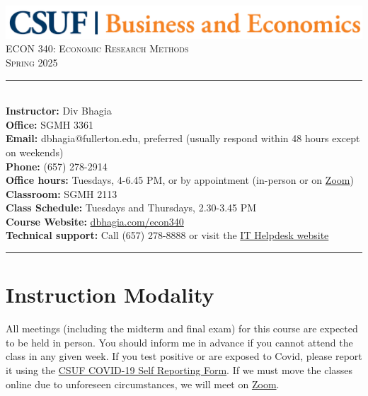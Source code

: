 \documentclass{syllabus}
\begin{document}
\begin{center}
\includegraphics[scale=0.22]{CBE-Wordmark-CMYK} \\ \vspace{0.5em}
{\large \textsc{ECON 340: Economic Research Methods}} \\
{\large \textsc{Spring 2025}}
\end{center}

\begin{center}
\begin{minipage}[t]{\textwidth}
\rule{\textwidth}{0.5pt} \\
\textbf{Instructor:} Div Bhagia \\
\textbf{Office:} SGMH 3361 \\
\textbf{Email:} dbhagia@fullerton.edu, preferred (usually respond within 48 hours except on weekends) \\
\textbf{Phone:} (657) 278-2914 \\
\textbf{Office hours:} Tuesdays, 4-6.45 PM, or by appointment (in-person or on \href{https://fullerton.zoom.us/j/81895171931}{Zoom}) \\
\textbf{Classroom:} SGMH 2113 \\
\textbf{Class Schedule:} Tuesdays and Thursdays, 2.30-3.45 PM \\
\textbf{Course Website:} \href{https://dbhagia.com/econ340}{dbhagia.com/econ340} \\
\textbf{Technical support:} Call (657) 278-8888 or visit the \href{https://www.fullerton.edu/it/students/helpdesk/index.php}{IT Helpdesk website} \\
\rule{\textwidth}{0.5pt} 
\end{minipage}
\end{center}

\vspace{0.35cm}
\section*{Instruction Modality}
All meetings (including the midterm and final exam) for this course are expected to be held in person. You should inform me in advance if you cannot attend the class in any given week. If you test positive or are exposed to Covid, please report it using the \href{https://coronavirus.fullerton.edu/report-covid-19-case-or-exposure/}{CSUF COVID-19 Self Reporting Form}. If we must move the classes online due to unforeseen circumstances, we will meet on \href{https://fullerton.zoom.us/j/81895171931}{Zoom}.
\end{document}
